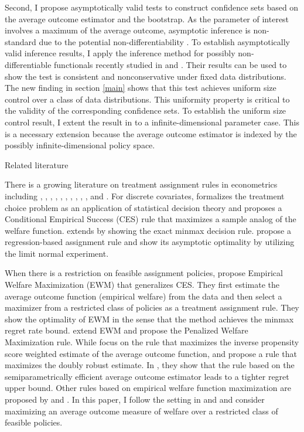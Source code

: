 \documentclass[12pt,oneside,reqno,english]{amsart}
\makeatletter
\renewcommand\subsection{\@startsection{subsection}{2}%
  \z@{-.5\linespacing\@plus-.7\linespacing}{.5\linespacing}%
  {\normalfont\scshape}}
\theoremstyle{definition}
\makeatother
\begin{document}
Second, I propose asymptotically valid tests to construct confidence sets based on the average outcome estimator and the bootstrap. 
As the parameter of interest involves a maximum of the average outcome, asymptotic inference is non-standard due to the potential non-differentiability \citep{HP:12}. 
To establish asymptotically valid inference results, I apply the inference method for possibly non-differentiable functionals recently studied in \cite{FS:16} and \cite{HL:18}. Their results can be used to show the test is consistent and nonconservative under fixed data distributions. The new finding in section \ref{main} shows that this test achieves uniform size control over a class of data distributions. This uniformity property is critical to the validity of the corresponding confidence sets. To establish the uniform size control result, I extent the result in \cite{HL:18} to a infinite-dimensional parameter case. This is a necessary extension because the average outcome estimator is indexed by the possibly infinite-dimensional policy space. 

\subsection{Related literature}

There is a growing literature on treatment assignment rules in econometrics including 
\cite{Manski:04}, \cite{Dehejia:05}, \cite{Stoye:09,Stoye:12}, \cite{HP:09}, \cite{Chamberlain:11}, \cite{BD:12}, \cite{Tetenov:12}, \cite{Kasy:14,Kasy:16}, \cite{KT:17,KT:18}, \cite{MT:16}, \cite{AW:17}
and \cite{MT:18}.
For discrete covariates, \cite{Manski:04} formalizes the treatment choice problem as an application of statistical decision theory and
proposes a Conditional Empirical Success (CES) rule that maximizes a sample analog of the welfare function.
\cite{Stoye:09} extends \cite{Manski:04} by showing the exact minmax decision rule. \cite{HP:09} propose a regression-based assignment rule and show its asymptotic optimality by utilizing the limit normal experiment.  

When there is a restriction on feasible assignment policies, 
\cite{KT:18} propose Empirical Welfare Maximization (EWM) that generalizes CES.   
They first estimate the average outcome function (empirical welfare) from the data and then select a maximizer from a restricted class of policies as a treatment assignment rule. They show the optimality of EWM in the sense that the method achieves the minmax regret rate bound. \cite{MT:16} extend EWM and propose the Penalized Welfare Maximization rule. 
While \cite{KT:18} focus on the rule that maximizes the inverse propensity score weighted estimate of the average outcome function, 
\cite{DLL:11} and \cite{AW:17} propose a rule that maximizes the doubly robust estimate. 
In \cite{AW:17}, they show that the rule based on the semiparametrically efficient average outcome estimator leads to a tighter regret upper bound.
Other rules based on empirical welfare function maximization are proposed by \cite{ZZRK:12} and 
\cite{ZMKK:17}.
In this paper, I follow the setting in \cite{KT:18} and \cite{AW:17} and consider 
maximizing an average outcome measure of welfare over a restricted class of feasible policies.
\end{document}
